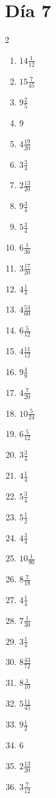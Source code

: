 \documentclass[12pt]{article}
\begin{document}
\section*{Día 7}
\begin{multicols}{2}\begin{enumerate}
\item $ 14 \frac{1}{12} $
\item $ 15 \frac{7}{45} $
\item $ 9 \frac{2}{5} $
\item $ 9 $
\item $ 4 \frac{19}{20} $
\item $ 3 \frac{3}{4} $
\item $ 2 \frac{13}{20} $
\item $ 9 \frac{3}{4} $
\item $ 5 \frac{3}{4} $
\item $ 6 \frac{1}{36} $
\item $ 3 \frac{17}{20} $
\item $ 4 \frac{1}{4} $
\item $ 4 \frac{53}{60} $
\item $ 6 \frac{5}{12} $
\item $ 4 \frac{11}{12} $
\item $ 9 \frac{4}{9} $
\item $ 4 \frac{7}{20} $
\item $ 10 \frac{5}{24} $
\item $ 6 \frac{5}{12} $
\item $ 3 \frac{3}{4} $
\item $ 4 \frac{1}{4} $
\item $ 5 \frac{3}{4} $
\item $ 5 \frac{1}{2} $
\item $ 4 \frac{3}{4} $
\item $ 10 \frac{1}{90} $
\item $ 8 \frac{7}{18} $
\item $ 4 \frac{1}{4} $
\item $ 7 \frac{1}{30} $
\item $ 3 \frac{1}{4} $
\item $ 8 \frac{43}{72} $
\item $ 8 \frac{1}{10} $
\item $ 5 \frac{11}{45} $
\item $ 9 \frac{1}{2} $
\item $ 6 $
\item $ 2 \frac{13}{20} $
\item $ 3 \frac{7}{12} $

\end{enumerate}
\end{multicols}
\end{document}
